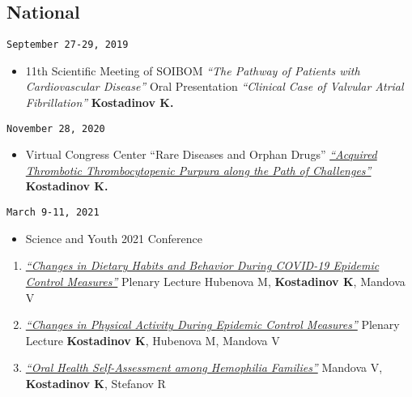 \documentclass[
  12pt,
  letterpaper,
  DIV=11,
  numbers=noendperiod]{scrartcl}
\providecommand{\tightlist}{%
  \setlength{\itemsep}{0pt}\setlength{\parskip}{0pt}}\usepackage{longtable,booktabs,array}
\begin{document}
\subsection{National}\label{national-1}

\texttt{September\ 27-29,\ 2019}

\begin{itemize}
\tightlist
\item
  11th Scientific Meeting of SOIBOM \textbar{} \emph{``The Pathway of
  Patients with Cardiovascular Disease''} \textbar{} Oral Presentation
  \textbar{} \emph{``Clinical Case of Valvular Atrial Fibrillation''}
  \textbar{} \textbf{Kostadinov K.}
\end{itemize}

\texttt{November\ 28,\ 2020}

\begin{itemize}
\tightlist
\item
  Virtual Congress Center ``Rare Diseases and Orphan Drugs'' \textbar{}
  \emph{\href{https://youtu.be/R_UbvDcyTxs}{``Acquired Thrombotic
  Thrombocytopenic Purpura along the Path of Challenges''}} \textbar{}
  \textbf{Kostadinov K.}
\end{itemize}

\texttt{March\ 9-11,\ 2021}

\begin{itemize}
\tightlist
\item
  Science and Youth 2021 Conference
\end{itemize}

\begin{enumerate}
\def\labelenumi{\arabic{enumi}.}
\item
  \emph{\href{https://www.asclepius.bg/images/nm2021/\%D0\%9F\%D0\%A0\%D0\%9E\%D0\%93\%D0\%A0\%D0\%90\%D0\%9C\%D0\%90-\%D0\%9D\%D0\%90\%D0\%A3\%D0\%9A\%D0\%90-\%D0\%98-\%D0\%9C\%D0\%9B\%D0\%90\%D0\%94\%D0\%9E\%D0\%A1\%D0\%A2-2021.pdf}{``Changes
  in Dietary Habits and Behavior During COVID-19 Epidemic Control
  Measures''}} \textbar{} Plenary Lecture \textbar{} Hubenova M,
  \textbf{Kostadinov K}, Mandova V
\item
  \emph{\href{https://www.asclepius.bg/images/nm2021/\%D0\%9F\%D0\%A0\%D0\%9E\%D0\%93\%D0\%A0\%D0\%90\%D0\%9C\%D0\%90-\%D0\%9D\%D0\%90\%D0\%A3\%D0\%9A\%D0\%90-\%D0\%98-\%D0\%9C\%D0\%9B\%D0\%90\%D0\%94\%D0\%9E\%D0\%A1\%D0\%A2-2021.pdf}{``Changes
  in Physical Activity During Epidemic Control Measures''}} \textbar{}
  Plenary Lecture \textbar{} \textbf{Kostadinov K}, Hubenova M, Mandova
  V
\item
  \emph{\href{https://asclepius.bg/cnm/wp-content/uploads/2022/05/Sbornik-Nauka-i-Mladost-2021.pdf}{``Oral
  Health Self-Assessment among Hemophilia Families''}} \textbar{}
  Mandova V, \textbf{Kostadinov K}, Stefanov R
\end{enumerate}
\end{document}
